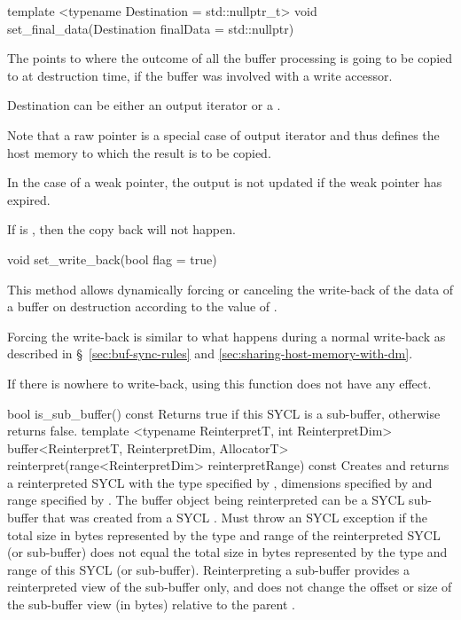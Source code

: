    \addRowTwoL
    {template <typename Destination = std::nullptr_t>}
    {void set_final_data(Destination finalData = std::nullptr)}
    {
      The  points to where the outcome of all
      the buffer processing is going to be copied to at destruction
      time, if the buffer was involved with a write accessor.

      Destination can be either an output iterator or a
      .

      Note that a raw pointer is a special case of output iterator and
      thus defines the host memory to which the result is to be
      copied.

      In the case of a weak pointer, the output is not updated if the
      weak pointer has expired.

      If  is , then
      the copy back will not happen.
    }

   \addRow
    {void set_write_back(bool flag = true)}
    {
      This method allows dynamically forcing or canceling the
      write-back of the data of a buffer on destruction according to
      the value of .

      Forcing the write-back is similar to what happens during a
      normal write-back as described in \S~\ref{sec:buf-sync-rules}
      and \ref{sec:sharing-host-memory-with-dm}.

      If there is nowhere to write-back, using this function does not
      have any effect.
    }
   \addRow
    {bool is_sub_buffer() const}
    {
      Returns true if this SYCL  is a sub-buffer, otherwise
      returns false.
    }
   \addRowThreeL
     { template <typename ReinterpretT, int ReinterpretDim> }
     { buffer<ReinterpretT, ReinterpretDim, AllocatorT> }
     { reinterpret(range<ReinterpretDim> reinterpretRange) const }
     {
       Creates and returns a reinterpreted SYCL  with the
       type specified by , dimensions specified by
        and range specified by
       .  The buffer object being reinterpreted can
       be a SYCL sub-buffer that was created from a SYCL .  Must throw an
        SYCL exception if the total size in
       bytes represented by the type and range of the reinterpreted SYCL
        (or sub-buffer) does not equal the total
       size in bytes represented by the type and range of this SYCL
        (or sub-buffer).  Reinterpreting a sub-buffer provides
       a reinterpreted view of the sub-buffer only, and does not change the
       offset or size of the sub-buffer view (in bytes) relative to the parent
       .
     }
\completeTable

